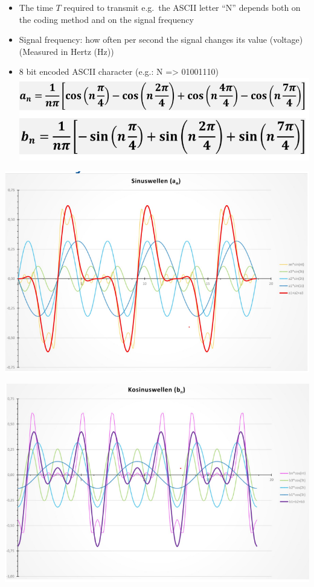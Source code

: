 \documentclass[11pt]{article}
\begin{document}
\begin{itemize}
    \item The time \(T\) required to transmit e.g.\ the ASCII letter “N” depends both on the coding method and on the signal frequency
    \item Signal frequency: how often per second the signal changes its value (voltage) (Measured in Hertz (Hz))
    \item 8 bit encoded ASCII character (e.g.: N => 01001110) \\
    \includegraphics[width=\textwidth]{fourier-analysis-9.png}
\end{itemize}

\includegraphics[width=\textwidth]{fourier-analysis-10.png}

\includegraphics[width=\textwidth]{fourier-analysis-11.png}
\end{document}
